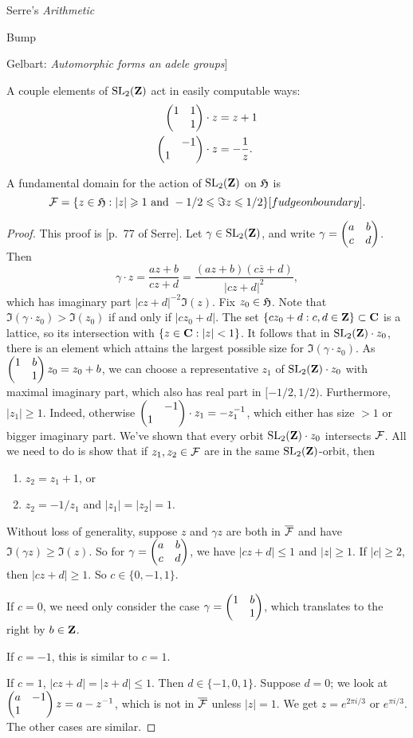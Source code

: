Serre's \emph{Arithmetic}

Bump

Gelbart: \emph{Automorphic forms an adele groups}]

A couple elements of $\operatorname{SL}_2(\mathbf{Z})$ act in easily computable ways:
\begin{align*}
  \begin{pmatrix} 1 & 1 \\  & 1 \end{pmatrix}\cdot z &= z+1 \\
  \begin{pmatrix}  & -1 \\ 1 &  \end{pmatrix}\cdot z &= -\frac 1 z .
\end{align*}

\begin{theorem}
A fundamental domain for the action of $\operatorname{SL}_2(\mathbf{Z})$ on $\mathfrak{H}$ is 
\[
  \mathcal{F} = \{z\in \mathfrak{H}:|z|\geqslant 1\text{ and }-1/2\leqslant \Im z\leqslant 1/2 \} [fudge on boundary].
\]
\end{theorem}
\begin{proof}
This proof is [p.~77 of Serre]. Let $\gamma\in \operatorname{SL}_2(\mathbf{Z})$, and write 
$\gamma=\begin{pmatrix} a & b \\ c & d \end{pmatrix}$. Then 
\[
  \gamma\cdot z = \frac{a z+b}{c z+d} = \frac{(a z+b)(c\bar z+d)}{|c z+d|^2} ,
\]
which has imaginary part $|c z+d|^{-2} \Im(z)$. Fix $z_0\in \mathfrak{H}$. Note that 
$\Im(\gamma\cdot z_0)>\Im(z_0)$ if and only if $|c z_0+d|$. The set 
$\{c z_0+d:c,d\in \mathbf{Z}\}\subset \mathbf{C}$ is a lattice, so its intersection with 
$\{z\in \mathbf{C}:|z|<1\}$. It follows that in $\operatorname{SL}_2(\mathbf{Z})\cdot z_0$, there is an 
element which attains the largest possible size for $\Im(\gamma\cdot z_0)$. 
As $\begin{pmatrix} 1 & b \\  & 1 \end{pmatrix} z_0 = z_0+b$, we can choose a representative $z_1$ of 
$\operatorname{SL}_2(\mathbf{Z})\cdot z_0$ with maximal imaginary part, which also has real 
part in $[-1/2,1/2)$. Furthermore, $|z_1|\geqslant 1$. Indeed, otherwise 
$\begin{pmatrix}  & -1 \\ 1 &  \end{pmatrix}\cdot z_1=-z_1^{-1}$, which either has size $>1$ or bigger 
imaginary part. We've shown that every orbit $\operatorname{SL}_2(\mathbf{Z})\cdot z_0$ intersects 
$\mathcal{F}$. All we need to do is show that if $z_1,z_2\in \mathcal{F}$ are in the same 
$\operatorname{SL}_2(\mathbf{Z})$-orbit, then 
\begin{enumerate}
  \item $z_2=z_1+1$, or 
  \item $z_2=-1/z_1$ and $|z_1|=|z_2|=1$. 
\end{enumerate}
Without loss of generality, suppose $z$ and $\gamma z$ are both in 
$\overline{\mathcal{F}}$ and have $\Im(\gamma z)\geqslant \Im(z)$. So for 
$\gamma=\begin{pmatrix} a & b \\ c & d \end{pmatrix}$, we have $|c z+d|\leqslant 1$ and $|z|\geqslant 1$. 
If $|c|\geqslant 2$, then $|c z+d|\geqslant 1$. So $c\in \{0,-1,1\}$. 

If $c=0$, we need only consider the case 
$\gamma=\begin{pmatrix} 1 & b \\  & 1 \end{pmatrix}$, which translates to the right by $b\in \mathbf{Z}$. 

If $c=-1$, this is similar to $c=1$. 

If $c=1$, $|c z+d|=|z+d|\leqslant 1$. Then $d\in \{-1,0,1\}$. Suppose $d=0$; 
we look at $\begin{pmatrix} a & -1 \\ 1 &  \end{pmatrix} z=a-z^{-1}$, which is not in 
$\overline{\mathcal{F}}$ unless $|z|=1$. We get $z=e^{2\pi i/3}$ or $e^{\pi i/3}$. The 
other cases are similar. 
\end{proof}

